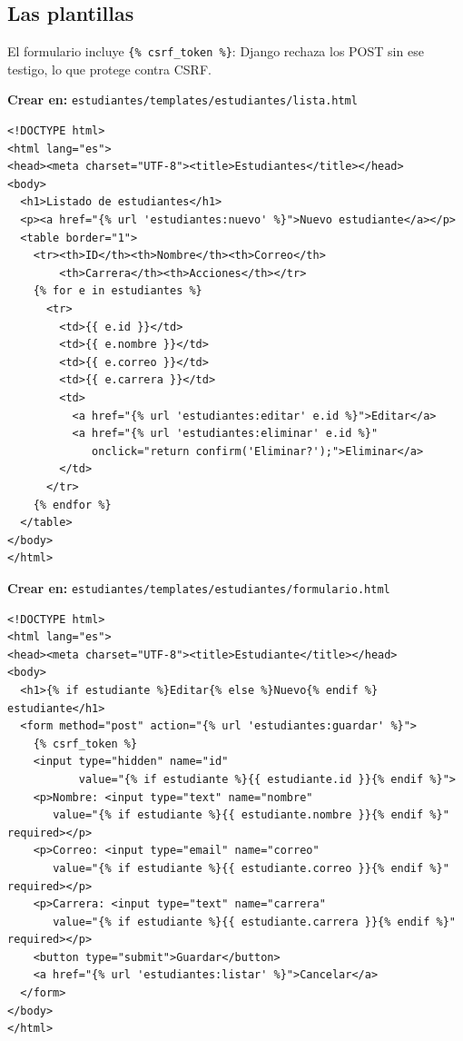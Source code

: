 \documentclass[11pt,a4paper,openany]{book}
\begin{document}
\subsection{Las plantillas}
\label{ap:crud:django:templates}

El formulario incluye \texttt{\{\% csrf\_token \%\}}: Django rechaza los
POST sin ese testigo, lo que protege contra CSRF.

{\small\textbf{Crear en:} \texttt{estudiantes/templates/estudiantes/lista.html}}
\begin{lstlisting}[style=html,caption={lista.html (plantilla de listado)},label={lst:dj-lista}]
<!DOCTYPE html>
<html lang="es">
<head><meta charset="UTF-8"><title>Estudiantes</title></head>
<body>
  <h1>Listado de estudiantes</h1>
  <p><a href="{% url 'estudiantes:nuevo' %}">Nuevo estudiante</a></p>
  <table border="1">
    <tr><th>ID</th><th>Nombre</th><th>Correo</th>
        <th>Carrera</th><th>Acciones</th></tr>
    {% for e in estudiantes %}
      <tr>
        <td>{{ e.id }}</td>
        <td>{{ e.nombre }}</td>
        <td>{{ e.correo }}</td>
        <td>{{ e.carrera }}</td>
        <td>
          <a href="{% url 'estudiantes:editar' e.id %}">Editar</a>
          <a href="{% url 'estudiantes:eliminar' e.id %}"
             onclick="return confirm('Eliminar?');">Eliminar</a>
        </td>
      </tr>
    {% endfor %}
  </table>
</body>
</html>
\end{lstlisting}

{\small\textbf{Crear en:} \texttt{estudiantes/templates/estudiantes/formulario.html}}
\begin{lstlisting}[style=html,caption={formulario.html (alta y edicion)},label={lst:dj-form}]
<!DOCTYPE html>
<html lang="es">
<head><meta charset="UTF-8"><title>Estudiante</title></head>
<body>
  <h1>{% if estudiante %}Editar{% else %}Nuevo{% endif %} estudiante</h1>
  <form method="post" action="{% url 'estudiantes:guardar' %}">
    {% csrf_token %}
    <input type="hidden" name="id"
           value="{% if estudiante %}{{ estudiante.id }}{% endif %}">
    <p>Nombre: <input type="text" name="nombre"
       value="{% if estudiante %}{{ estudiante.nombre }}{% endif %}" required></p>
    <p>Correo: <input type="email" name="correo"
       value="{% if estudiante %}{{ estudiante.correo }}{% endif %}" required></p>
    <p>Carrera: <input type="text" name="carrera"
       value="{% if estudiante %}{{ estudiante.carrera }}{% endif %}" required></p>
    <button type="submit">Guardar</button>
    <a href="{% url 'estudiantes:listar' %}">Cancelar</a>
  </form>
</body>
</html>
\end{lstlisting}
\end{document}
